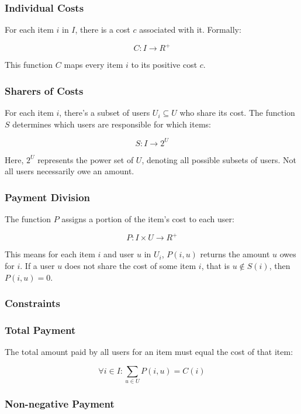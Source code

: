 \documentclass[12pt]{article}
\begin{document}
\subsubsection*{Individual Costs}

For each item $i$ in $I$, there is a cost $c$ associated with it. Formally:

\[
C: I \rightarrow R^+
\]

This function $C$ maps every item $i$ to its positive cost $c$.

\subsubsection*{Sharers of Costs}

For each item $i$, there's a subset of users $U_i \subseteq U$ who share its cost. The function $S$ determines which users are responsible for which items:

\[
S: I \rightarrow 2^U
\]

Here, $2^U$ represents the power set of $U$, denoting all possible subsets of users. Not all users necessarily owe an amount.

\subsubsection*{Payment Division}

The function $P$ assigns a portion of the item's cost to each user:

\[
P: I \times U \rightarrow R^+
\]

This means for each item $i$ and user $u$ in $U_i$, $P(i, u)$ returns the amount $u$ owes for $i$. If a user $u$ does not share the cost of some item $i$, that is $u \not\in S(i)$, then $P(i, u) = 0$.

\subsubsection*{Constraints}

\subsubsection*{Total Payment}

The total amount paid by all users for an item must equal the cost of that item:

\[
\forall i \in I: \sum_{u \in U} P(i, u) = C(i)
\]

\subsubsection*{Non-negative Payment}
\end{document}
